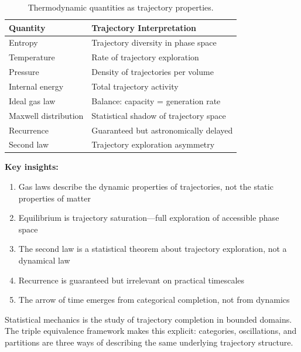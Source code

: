 \begin{table}[h]
\centering
\begin{tabular}{ll}
\hline
\textbf{Quantity} & \textbf{Trajectory Interpretation} \\
\hline
Entropy & Trajectory diversity in phase space \\
Temperature & Rate of trajectory exploration \\
Pressure & Density of trajectories per volume \\
Internal energy & Total trajectory activity \\
Ideal gas law & Balance: capacity = generation rate \\
Maxwell distribution & Statistical shadow of trajectory space \\
Recurrence & Guaranteed but astronomically delayed \\
Second law & Trajectory exploration asymmetry \\
\hline
\end{tabular}
\caption{Thermodynamic quantities as trajectory properties.}
\label{tab:trajectory_summary}
\end{table}

\textbf{Key insights:}
\begin{enumerate}
\item Gas laws describe the dynamic properties of trajectories, not the static properties of matter
\item Equilibrium is trajectory saturation—full exploration of accessible phase space
\item The second law is a statistical theorem about trajectory exploration, not a dynamical law
\item Recurrence is guaranteed but irrelevant on practical timescales
\item The arrow of time emerges from categorical completion, not from dynamics
\end{enumerate}

Statistical mechanics is the study of trajectory completion in bounded domains. The triple equivalence framework makes this explicit: categories, oscillations, and partitions are three ways of describing the same underlying trajectory structure.
